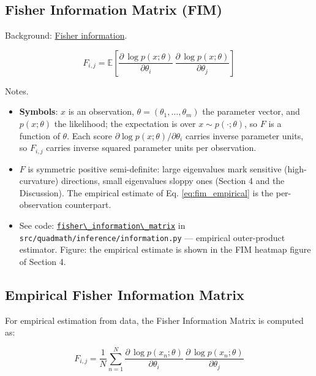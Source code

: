 \documentclass[
  10pt,
]{article}
\newcommand{\passthrough}[1]{#1}
\providecommand{\tightlist}{%
  \setlength{\itemsep}{0pt}\setlength{\parskip}{0pt}}
\begin{document}
\subsection{Fisher Information Matrix (FIM)}\label{eq:fim}

Background:
\href{https://en.wikipedia.org/wiki/Fisher_information}{Fisher
information}.

\begin{equation}\label{eq:fim}
F_{i,j} = \mathbb{E}\left[ \frac{\partial \, \log p(x;\theta)}{\partial \theta_i}\, \frac{\partial \, \log p(x;\theta)}{\partial \theta_j} \right]
\end{equation}

Notes.

\begin{itemize}
\tightlist
\item
  \textbf{Symbols}: \(x\) is an observation,
  \(\theta = (\theta_1, \ldots, \theta_m)\) the parameter vector, and
  \(p(x;\theta)\) the likelihood; the expectation is over
  \(x \sim p(\cdot;\theta)\), so \(F\) is a function of \(\theta\). Each
  score \(\partial \log p(x;\theta)/\partial \theta_i\) carries inverse
  parameter units, so \(F_{i,j}\) carries inverse squared parameter
  units per observation.
\item
  \(F\) is symmetric positive semi-definite: large eigenvalues mark
  sensitive (high-curvature) directions, small eigenvalues sloppy ones
  (Section 4 and the Discussion). The empirical estimate of Eq.
  \eqref{eq:fim_empirical} is the per-observation counterpart.
\item
  See code:
  \href{03_quadray_methods.md\#code:fisher_information_matrix}{\passthrough{\lstinline!fisher\_information\_matrix!}}
  in \passthrough{\lstinline!src/quadmath/inference/information.py!} ---
  empirical outer-product estimator. Figure: the empirical estimate is
  shown in the FIM heatmap figure of Section 4.
\end{itemize}

\subsection{Empirical Fisher Information
Matrix}\label{empirical-fisher-information-matrix}

For empirical estimation from data, the Fisher Information Matrix is
computed as:

\begin{equation}\label{eq:fim_empirical}
F_{i,j} = \frac{1}{N} \sum_{n=1}^{N} \frac{\partial \, \log p(x_n;\theta)}{\partial \theta_i}\, \frac{\partial \, \log p(x_n;\theta)}{\partial \theta_j}
\end{equation}
\end{document}
